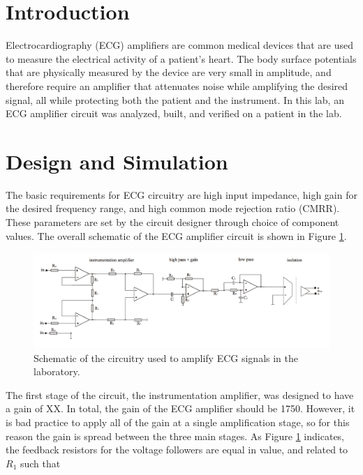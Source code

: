 \documentclass[pdftex,12pt,letterpaper]{article}
\begin{document}
\section{Introduction}

Electrocardiography (ECG) amplifiers are common  medical devices that are used to measure the electrical activity of a patient's heart. The body surface potentials that are physically measured by the device are very small in amplitude, and therefore require an amplifier that attenuates noise while amplifying the desired signal, all while protecting both the patient and the instrument. In this lab, an ECG amplifier circuit was analyzed, built, and verified on a patient in the lab.

\section{Design and Simulation}

The basic requirements for ECG circuitry are high input impedance, high gain for the desired frequency range, and high common mode rejection ratio (CMRR). These parameters are set by the circuit designer through choice of component values. The overall schematic of the ECG amplifier circuit is shown in Figure \ref{fig:circuit}.

\begin{figure}[H]
\begin{center}
\includegraphics[scale=.35]{ECG_circuit.png}
\caption{Schematic of the circuitry used to amplify ECG signals in the laboratory.}
\label{fig:circuit}
\end{center}
\end{figure}

The first stage of the circuit, the instrumentation amplifier, was designed to have a gain of XX. %
In total, the gain of the ECG amplifier should be 1750. However, it is bad practice to apply all of the gain at a single amplification stage, so for this reason the gain is spread between the three main stages. As Figure \ref{fig:circuit} indicates, the feedback resistors for the voltage followers are equal in value, and related to $R_1$ such that %
\end{document}
